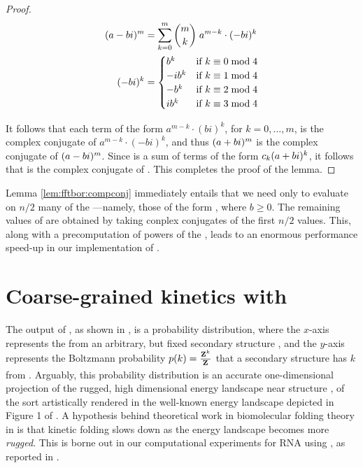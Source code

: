 \begin{proof}
\begin{align}
\begin{split}
(a-bi)^m &= \sum_{k=0}^m \binom{m}{k}\; a^{m-k} \cdot (-bi)^k \\
(-bi)^k &=
\begin{cases}
b^k   & \text{if $k \equiv 0 \bmod 4$} \\
-ib^k & \text{if $k \equiv 1 \bmod 4$} \\
-b^k  & \text{if $k \equiv 2 \bmod 4$} \\
ib^k  & \text{if $k \equiv 3 \bmod 4$} \\
\end{cases}
\end{split}
\end{align}

It follows that each term of the form
$a^{m-k} \cdot (bi)^k$, for $k=0,\dots,m$, is the complex conjugate of
$a^{m-k} \cdot (-bi)^k$, and thus $(a+bi)^m$ is the complex conjugate of
$(a-bi)^m$. Since \emZof{}{\aPbi} is a sum of terms of the form $c_k (a+bi)^k$,
it follows that \emZof{}{\aMbi} is the complex conjugate of \emZof{}{\aPbi}.
This completes the proof of the lemma.

\end{proof}

Lemma \ref{lem:fftbor:compconj} immediately entails that we need only to evaluate \fullZx on $n/2$
many of the \nRoUs---namely, those of the form
\aPbi, where $b \geq 0$. The remaining values of \fullZx are obtained by
taking conplex conjugates of the first $n/2$ values. This, along with a
precomputation of powers of the \nRoUs, leads to an
enormous performance speed-up in our implementation of \fftbor.

\section{Coarse-grained kinetics with \fftbor}
\label{sec:fftbor:kinetics}

The output of \fftbor, as shown in
, is a probability distribution,
where the $x$-axis represents the \bpd from an arbitrary,
but fixed secondary structure \strSt, and the $y$-axis represents the
Boltzmann probability $p(k) = \frac{{\bf Z}^{k}_{}}{{\bf Z}^{}_{}}$ that a secondary structure
has \bpd $k$ from \strSt. Arguably, this probability distribution
is an accurate one-dimensional projection of the rugged, high dimensional energy
landscape near structure \strSt,
of the sort artistically rendered in the well-known
energy landscape depicted in Figure 1 of \citep{wolynes.ptam05}.
A hypothesis behind theoretical work in biomolecular folding theory in
\citep{bryngelson.p95}
is that kinetic folding slows down as the energy landscape becomes more
{\em rugged}. This is borne out in our computational experiments for RNA
using \fftbor, as reported
in .

